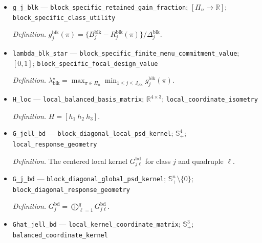 \documentclass{article}
\begin{document}
\begin{itemize}
  \par\smallskip\noindent\emph{Definition.} \(\Delta_j^{\mathrm{blk}}=B_j^{\mathrm{blk}}-(r_j^{\mathrm{blk}})^\star\).
  \item \texttt{g\_\allowbreak{}j\_\allowbreak{}blk} --- \texttt{block\_\allowbreak{}specific\_\allowbreak{}retained\_\allowbreak{}gain\_\allowbreak{}fraction}; \([\Pi_n\to\mathbb R]\); \texttt{block\_\allowbreak{}specific\_\allowbreak{}class\_\allowbreak{}utility}
  \par\smallskip\noindent\emph{Definition.} \(g_j^{\mathrm{blk}}(\pi)=\{B_j^{\mathrm{blk}}-R_j^{\mathrm{blk}}(\pi)\}/\Delta_j^{\mathrm{blk}}\).
  \item \texttt{lambda\_\allowbreak{}blk\_\allowbreak{}star} --- \texttt{block\_\allowbreak{}specific\_\allowbreak{}finite\_\allowbreak{}menu\_\allowbreak{}commitment\_\allowbreak{}value}; \([0,1]\); \texttt{block\_\allowbreak{}specific\_\allowbreak{}focal\_\allowbreak{}design\_\allowbreak{}value}
  \par\smallskip\noindent\emph{Definition.} \(\lambda_{\mathrm{blk}}^\star=\max_{\pi\in\Pi_n}\min_{1\le j\le J_{\mathrm{blk}}}g_j^{\mathrm{blk}}(\pi)\).
  \item \texttt{H\_\allowbreak{}loc} --- \texttt{local\_\allowbreak{}balanced\_\allowbreak{}basis\_\allowbreak{}matrix}; \(\mathbb R^{4\times3}\); \texttt{local\_\allowbreak{}coordinate\_\allowbreak{}isometry}
  \par\smallskip\noindent\emph{Definition.} \(H=[h_1\ h_2\ h_3]\).
  \item \texttt{G\_\allowbreak{}jell\_\allowbreak{}bd} --- \texttt{block\_\allowbreak{}diagonal\_\allowbreak{}local\_\allowbreak{}psd\_\allowbreak{}kernel}; \(\mathbb S_+^4\); \texttt{local\_\allowbreak{}response\_\allowbreak{}geometry}
  \par\smallskip\noindent\emph{Definition.} The centered local kernel \(G^{\mathrm{bd}}_{j\ell}\) for class \(j\) and quadruple \(\ell\).
  \item \texttt{G\_\allowbreak{}j\_\allowbreak{}bd} --- \texttt{block\_\allowbreak{}diagonal\_\allowbreak{}global\_\allowbreak{}psd\_\allowbreak{}kernel}; \(\mathbb S_+^n\setminus\{0\}\); \texttt{block\_\allowbreak{}diagonal\_\allowbreak{}response\_\allowbreak{}geometry}
  \par\smallskip\noindent\emph{Definition.} \(G_j^{\mathrm{bd}}=\bigoplus_{\ell=1}^qG^{\mathrm{bd}}_{j\ell}\).
  \item \texttt{Ghat\_\allowbreak{}jell\_\allowbreak{}bd} --- \texttt{local\_\allowbreak{}kernel\_\allowbreak{}coordinate\_\allowbreak{}matrix}; \(\mathbb S_+^3\); \texttt{balanced\_\allowbreak{}coordinate\_\allowbreak{}kernel}

\end{itemize}
\end{document}

